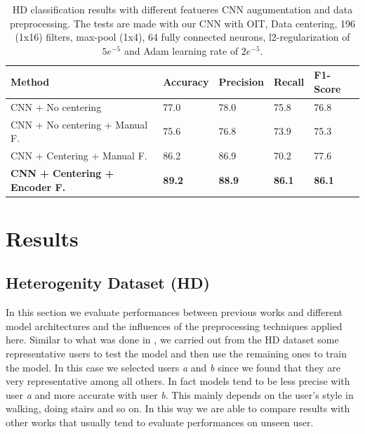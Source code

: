 
\begin{table}[t]
	\begin{center}
		\begin{tabular}{ p{7cm}p{2cm}p{2cm}p{2cm}p{2cm} }
			\hline
			Method & Accuracy & Precision & Recall & F1-Score \\
			\hline
			CNN + No centering & 77.0 & 78.0 & 75.8 & 76.8 \\
			CNN + No centering + Manual F. & 75.6 & 76.8 & 73.9 & 75.3 \\
			CNN + Centering + Manual F. & 86.2 & 86.9 & 70.2 & 77.6 \\
			\textbf{CNN + Centering + Encoder F.} & \textbf{89.2} & \textbf{88.9} &  \textbf{86.1} & \textbf{86.1} \\
			\hline
		\end{tabular}
		\caption{\label{tab:model-performance} HD classification results with different featueres CNN augumentation and data preprocessing. The tests are made with our CNN with OIT, Data centering, 196 (1x16) filters, max-pool (1x4), 64 fully connected neurons, l2-regularization of $5e^{-5}$ and Adam learning rate of $2e^{-5}$.}
	\end{center}
\end{table}

\section{Results}
\label{sec:results}

\subsection{Heterogenity Dataset (HD)}
\label{subsec:heterogeneity-dataset}

In this section we evaluate performances between previous works and
different model architectures and the influences of the
preprocessing techniques applied here. Similar to what was done in
\cite{ignatov2018real}, we carried out from the HD dataset some
representative users to test the model and then use the remaining ones
to train the model. In this case we selected users \textit{a} and
\textit{b} since we found that they are very representative among all
others. In fact models tend to be less precise with user \textit{a}
and more accurate with user \textit{b}. This mainly depends on the
user's style in walking, doing stairs and so on. In this way we are
able to compare results with other works that usually tend to evaluate
performances on unseen user.

